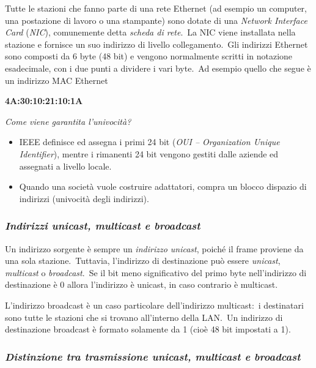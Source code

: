 Tutte le stazioni che fanno parte di una rete Ethernet (ad esempio un computer, una postazione di lavoro o una stampante) sono dotate di una \emph{Network Interface Card} (\emph{NIC}), comunemente detta \emph{scheda di rete}.\
La NIC viene installata nella stazione e fornisce un suo indirizzo di livello collegamento.\
Gli indirizzi Ethernet sono composti da 6 byte (48 bit) e vengono normalmente scritti in notazione esadecimale, con i due punti a dividere i vari byte.\
Ad esempio quello che segue è un indirizzo MAC Ethernet
\begin{center}
    \textbf{4A:30:10:21:10:1A}
\end{center}

\begin{center}
    \emph{Come viene garantita l’univocità?}
\end{center}
\begin{itemize}
    \item IEEE definisce ed assegna i primi 24 bit (\emph{OUI – Organization Unique Identifier}), mentre i rimanenti 24 bit vengono gestiti dalle aziende ed assegnati a livello locale.
    \item Quando una società vuole costruire adattatori, compra un blocco dispazio di  indirizzi (univocità degli indirizzi).
\end{itemize}

\subsubsection{\emph{Indirizzi unicast, multicast e broadcast}}

Un indirizzo sorgente è sempre un \emph{indirizzo unicast}, poiché il frame proviene da una sola stazione.\
Tuttavia, l'indirizzo di destinazione può essere \emph{unicast}, \emph{multicast} o \emph{broadcast}.\
Se il bit meno significativo del primo byte nell'indirizzo di destinazione è 0 allora l'indirizzo è unicast, in caso contrario è multicast.

L'indirizzo broadcast è un caso particolare dell'indirizzo multicast:\ i destinatari sono tutte le stazioni che si trovano all'interno della LAN.\
Un indirizzo di destinazione broadcast è formato solamente da 1 (cioè 48 bit impostati a 1).

\subsubsection{\emph{Distinzione tra trasmissione unicast, multicast e broadcast}}


